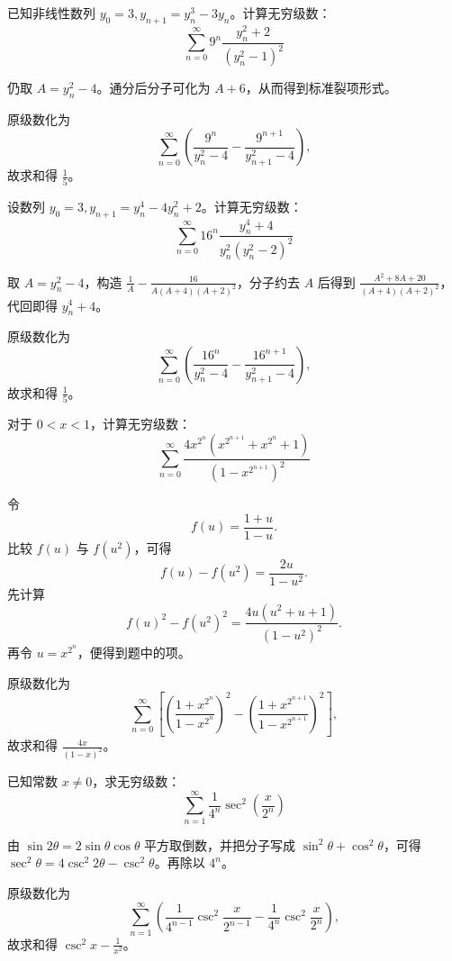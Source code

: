 \begin{example}
    已知非线性数列 \(y_0 = 3, y_{n+1} = y_n^3 - 3y_n\)。计算无穷级数：$$ \sum_{n=0}^\infty 9^n \frac{y_n^2+2}{(y_n^2-1)^2} $$
\end{example}
\begin{solution}
仍取 \(A=y_n^2-4\)。通分后分子可化为 \(A+6\)，从而得到标准裂项形式。

原级数化为
\[
\sum_{n=0}^{\infty}\left(\frac{9^n}{y_n^2-4}-\frac{9^{n+1}}{y_{n+1}^2-4}\right),
\]
故求和得 \(\frac{1}{5}\)。
\end{solution}

\begin{example}
设数列 \(y_0 = 3, y_{n+1} = y_n^4 - 4y_n^2 + 2\)。计算无穷级数：$$ \sum_{n=0}^\infty 16^n \frac{y_n^4+4}{y_n^2(y_n^2-2)^2} $$
\end{example}
\begin{solution}
取 \(A=y_n^2-4\)，构造 \(\frac{1}{A} - \frac{16}{A(A+4)(A+2)^2}\)，分子约去 \(A\) 后得到 \(\frac{A^2+8A+20}{(A+4)(A+2)^2}\)，代回即得 \(y_n^4+4\)。

原级数化为
\[
\sum_{n=0}^{\infty}\left(\frac{16^n}{y_n^2-4}-\frac{16^{n+1}}{y_{n+1}^2-4}\right),
\]
故求和得 \(\frac{1}{5}\)。
\end{solution}

\begin{example}
对于 \(0 < x < 1\)，计算无穷级数：$$ \sum_{n=0}^\infty \frac{4 x^{2^n} (x^{2^{n+1}} + x^{2^n} + 1)}{(1-x^{2^{n+1}})^2} $$
\end{example}
\begin{solution}
令
\[
f(u)=\frac{1+u}{1-u}.
\]
比较 \(f(u)\) 与 \(f(u^2)\)，可得
\[
f(u)-f(u^2)=\frac{2u}{1-u^2}.
\]
先计算
\[
f(u)^2-f(u^2)^2=\frac{4u(u^2+u+1)}{(1-u^2)^2}.
\]
再令 \(u=x^{2^n}\)，便得到题中的项。

原级数化为
\[
\sum_{n=0}^{\infty}\left[\left(\frac{1+x^{2^n}}{1-x^{2^n}}\right)^2-\left(\frac{1+x^{2^{n+1}}}{1-x^{2^{n+1}}}\right)^2\right],
\]
故求和得 \(\frac{4x}{(1-x)^2}\)。
\end{solution}

\begin{example}
已知常数 \(x \neq 0\)，求无穷级数：$$ \sum_{n=1}^{\infty} \frac{1}{4^n} \sec^2\left(\frac{x}{2^n}\right) $$
\end{example}
\begin{solution}
由 \(\sin 2\theta = 2\sin\theta\cos\theta\) 平方取倒数，并把分子写成 \(\sin^2\theta + \cos^2\theta\)，可得 \(\sec^2\theta = 4\csc^2 2\theta - \csc^2\theta\)。再除以 \(4^n\)。

原级数化为
\[
\sum_{n=1}^{\infty}\left(\frac{1}{4^{n-1}}\csc^2\frac{x}{2^{n-1}}-\frac{1}{4^n}\csc^2\frac{x}{2^n}\right),
\]
故求和得 \(\csc^2 x-\frac{1}{x^2}\)。
\end{solution}


